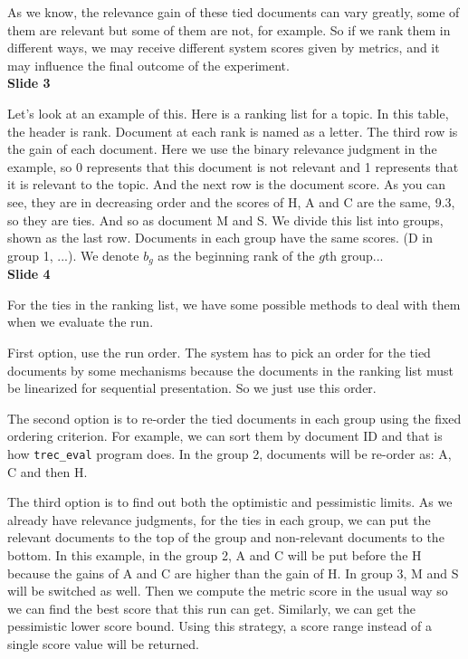 \documentclass{article}
\begin{document}
As we know, the relevance gain of these tied documents can vary greatly, some of them are relevant but some of them are not, for example. So if we rank them in different ways, we may receive different system scores given by metrics, and it may influence the final outcome of the experiment.\\[1em]

\textbf{Slide 3}

Let's look at an example of this. Here is a ranking list for a topic. In this table, the header is rank. Document at each rank is named as a letter. The third row is the gain of each document. Here we use the binary relevance judgment in the example, so 0 represents that this document is not relevant and 1 represents that it is relevant to the topic. And the next row is the document score. As you can see, they are in decreasing order and the scores of H, A and C are the same, 9.3, so they are ties. And so as document M and S. We divide this list into groups, shown as the last row. Documents in each group have the same scores. (D in group 1, ...). We denote $b_g$ as the beginning rank of the $g$th group...\\[1em]

\textbf{Slide 4}

For the ties in the ranking list, we have some possible methods to deal with them when we evaluate the run.

First option, use the run order. The system has to pick an order for the tied documents by some mechanisms because the documents in the ranking list must be linearized for sequential presentation. So we just use this order.

The second option is to re-order the tied documents in each group using the fixed ordering criterion. For example, we can sort them by document ID and that is how \texttt{trec\_eval} program does. In the group 2, documents will be re-order as: A, C and then H.

The third option is to find out both the optimistic and pessimistic limits. As we already have relevance judgments, for the ties in each group, we can put the relevant documents to the top of the group and non-relevant documents to the bottom. In this example, in the group 2, A and C will be put before the H because the gains of A and C are higher than the gain of H. In group 3, M and S will be switched as well. Then we compute the metric score in the usual way so we can find the best score that this run can get. Similarly, we can get the pessimistic lower score bound. Using this strategy, a score range instead of a single score value  will be returned.
\end{document}
